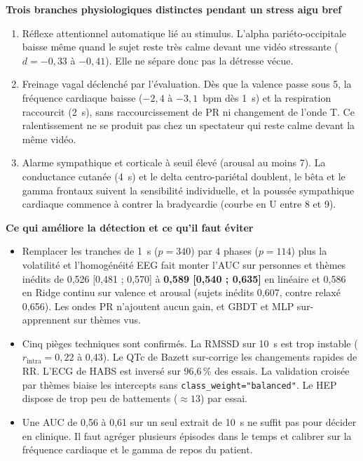 \documentclass[10pt]{article}
\begin{document}
\smallskip
{\small\textbf{Trois branches physiologiques distinctes pendant un stress aigu bref}
\begin{enumerate}
\item Réflexe attentionnel automatique lié au stimulus. L'alpha pariéto-occipitale baisse même quand le sujet reste très calme devant une vidéo stressante ($d = -0{,}33$ à $-0{,}41$). Elle ne sépare donc pas la détresse vécue.
\item Freinage vagal déclenché par l'évaluation. Dès que la valence passe sous 5, la fréquence cardiaque baisse ($-2{,}4$ à $-3{,}1$~bpm dès 1~s) et la respiration raccourcit (2~s), sans raccourcissement de PR ni changement de l'onde T. Ce ralentissement ne se produit pas chez un spectateur qui reste calme devant la même vidéo.
\item Alarme sympathique et corticale à seuil élevé (arousal au moins 7). La conductance cutanée (4~s) et le delta centro-pariétal doublent, le bêta et le gamma frontaux suivent la sensibilité individuelle, et la poussée sympathique cardiaque commence à contrer la bradycardie (courbe en U entre 8 et 9).
\end{enumerate}

\textbf{Ce qui améliore la détection et ce qu'il faut éviter}
\begin{itemize}
\item Remplacer les tranches de 1~s ($p = 340$) par 4 phases ($p = 114$) plus la volatilité et l'homogénéité EEG fait monter l'AUC sur personnes et thèmes inédits de 0,526 [0,481 ; 0,570] à \textbf{0,589 [0,540 ; 0,635]} en linéaire et 0,586 en Ridge continu sur valence et arousal (sujets inédits 0,607, contre relaxé 0,656). Les ondes PR n'ajoutent aucun gain, et GBDT et MLP sur-apprennent sur thèmes vus.
\item Cinq pièges techniques sont confirmés. La RMSSD sur 10~s est trop instable ($r_{\text{intra}} = 0{,}22$ à 0,43). Le QTc de Bazett sur-corrige les changements rapides de RR. L'ECG de HABS est inversé sur 96,6\,\% des essais. La validation croisée par thèmes biaise les intercepts sans \texttt{class\_weight="balanced"}. Le HEP dispose de trop peu de battements ($\approx 13$) par essai.
\item Une AUC de 0,56 à 0,61 sur un seul extrait de 10~s ne suffit pas pour décider en clinique. Il faut agréger plusieurs épisodes dans le temps et calibrer sur la fréquence cardiaque et le gamma de repos du patient.
\end{itemize}

}
\end{document}
